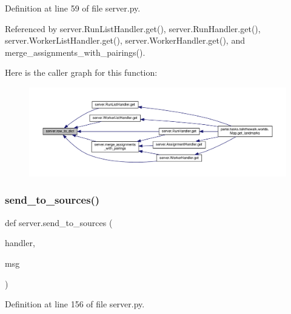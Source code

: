Definition at line 59 of file server.\+py.



Referenced by server.\+Run\+List\+Handler.\+get(), server.\+Run\+Handler.\+get(), server.\+Worker\+List\+Handler.\+get(), server.\+Worker\+Handler.\+get(), and merge\+\_\+assignments\+\_\+with\+\_\+pairings().

Here is the caller graph for this function\+:
\nopagebreak
\begin{figure}[H]
\begin{center}
\leavevmode
\includegraphics[width=350pt]{namespaceserver_a417f4d334a42b589c973649990ea52a8_icgraph}
\end{center}
\end{figure}
\mbox{\label{namespaceserver_a66add92486d2392c31b001d57d1e6b3e}} 
\subsubsection{\texorpdfstring{send\+\_\+to\+\_\+sources()}{send\_to\_sources()}}
{\footnotesize\ttfamily def server.\+send\+\_\+to\+\_\+sources (\begin{DoxyParamCaption}\item[{}]{handler,  }\item[{}]{msg }\end{DoxyParamCaption})}



Definition at line 156 of file server.\+py.

\mbox{\label{namespaceserver_a16739378649273e6ea462b460262a854}} 

